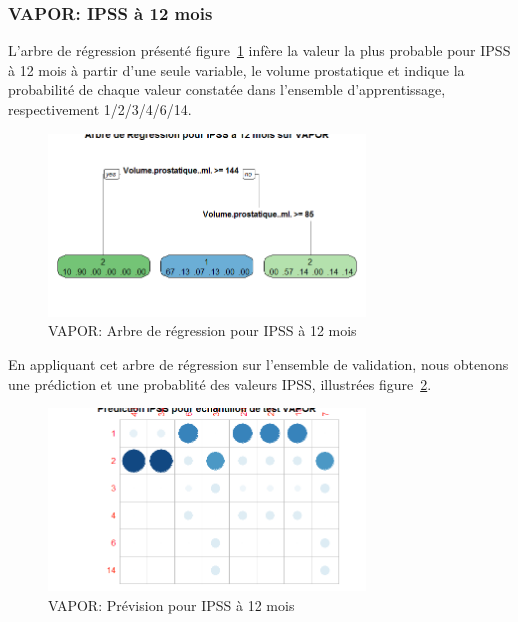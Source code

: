 %
%

%

\subsubsection{VAPOR: IPSS à 12 mois}

L'arbre de régression présenté figure~\ref{fig-vapor-regtree-ipss12} infère la valeur la plus probable pour IPSS à 12 mois à partir d'une seule variable, le volume prostatique et indique la probabilité de chaque valeur constatée dans l'ensemble d'apprentissage, respectivement 1/2/3/4/6/14.

\begin{figure}[H]
\centering
\includegraphics[width=0.75\textwidth]{../Fig/VAPOR/vapor-regtree-ipss12.png}
\caption{VAPOR: Arbre de régression pour IPSS à 12 mois}
\label{fig-vapor-regtree-ipss12}
\end{figure}

En appliquant cet arbre de régression sur l'ensemble de validation, nous obtenons une prédiction et une probablité des valeurs IPSS, illustrées figure~\ref{fig-vapor-regtree-predict-ipss12}.
 
\begin{figure}[H]
\centering
\includegraphics[width=0.75\textwidth]{../Fig/VAPOR/vapor-regtree-predict-ipss12.png}
\caption{VAPOR: Prévision pour IPSS à 12 mois}
\label{fig-vapor-regtree-predict-ipss12}
\end{figure}


